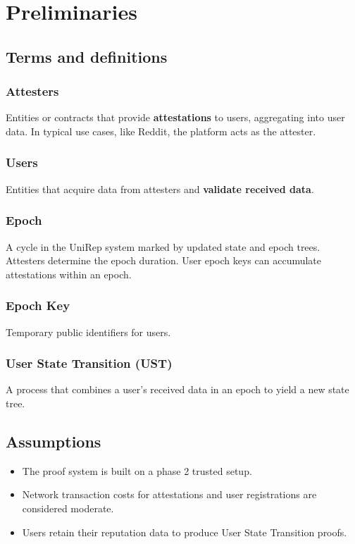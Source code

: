 \documentclass[11pt]{article}
\begin{document}
\section{Preliminaries}
\label{sec:org706d9ae}

\subsection{Terms and definitions}
\label{sec:orgdc97759}

\subsubsection{Attesters}
\label{sec:org6803040}
Entities or contracts that provide \textbf{\textbf{attestations}} to users, aggregating into user data. In typical use cases, like Reddit, the platform acts as the attester.
\subsubsection{Users}
\label{sec:org9857fc0}
Entities that acquire data from attesters and \textbf{\textbf{validate received data}}.
\subsubsection{Epoch}
\label{sec:org55f570c}
A cycle in the UniRep system marked by updated state and epoch trees. Attesters determine the epoch duration. User epoch keys can accumulate attestations within an epoch.
\subsubsection{Epoch Key}
\label{sec:orgbf9b614}
Temporary public identifiers for users.
\subsubsection{User State Transition (UST)}
\label{sec:org350a8a3}
A process that combines a user's received data in an epoch to yield a new state tree.
\subsection{Assumptions}
\label{sec:org3fd3b24}
\begin{itemize}
\item The proof system is built on a phase 2 trusted setup.
\item Network transaction costs for attestations and user registrations are considered moderate.
\item Users retain their reputation data to produce User State Transition proofs.
\end{itemize}
\end{document}
